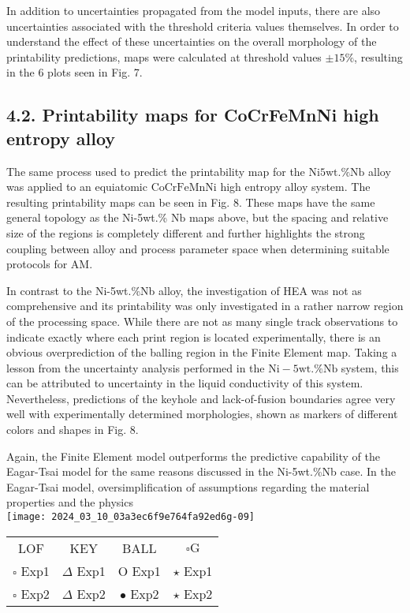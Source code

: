 \documentclass[10pt]{article}
\begin{document}
In addition to uncertainties propagated from the model inputs, there are also uncertainties associated with the threshold criteria values themselves. In order to understand the effect of these uncertainties on the overall morphology of the printability predictions, maps were calculated at threshold values $\pm 15 \%$, resulting in the 6 plots seen in Fig. 7.

\subsection*{4.2. Printability maps for CoCrFeMnNi high entropy alloy}
The same process used to predict the printability map for the Ni$5 \mathrm{wt} . \% \mathrm{Nb}$ alloy was applied to an equiatomic $\mathrm{CoCrFeMnNi}$ high entropy alloy system. The resulting printability maps can be seen in Fig. 8. These maps have the same general topology as the Ni-5wt.\% $\mathrm{Nb}$ maps above, but the spacing and relative size of the regions is completely different and further highlights the strong coupling between alloy and process parameter space when determining suitable protocols for AM.

In contrast to the Ni-5wt.\%Nb alloy, the investigation of HEA was not as comprehensive and its printability was only investigated in a rather narrow region of the processing space. While there are not as many single track observations to indicate exactly where each print region is located experimentally, there is an obvious overprediction of the balling region in the Finite Element map. Taking a lesson from the uncertainty analysis performed in the $\mathrm{Ni}-5 \mathrm{wt} . \% \mathrm{Nb}$ system, this can be attributed to uncertainty in the liquid conductivity of this system. Nevertheless, predictions of the keyhole and lack-of-fusion boundaries agree very well with experimentally determined morphologies, shown as markers of different colors and shapes in Fig. 8.

Again, the Finite Element model outperforms the predictive capability of the Eagar-Tsai model for the same reasons discussed in the Ni-5wt.\%Nb case. In the Eagar-Tsai model, oversimplification of assumptions regarding the material properties and the physics\\
\texttt{[image: 2024\_03\_10\_03a3ec6f9e764fa92ed6g-09]}

\begin{center}
\begin{tabular}{|cccc|}
\hline
LOF & KEY & BALL & $\square \mathrm{G}$ \\
$\square$ Exp1 & $\Delta$ Exp1 & O Exp1 & $\star$ Exp1 \\
$\square$ Exp2 & $\Delta$ Exp2 & $\bullet$ Exp2 & $\star$ Exp2 \\
\end{tabular}
\end{center}
\end{document}
